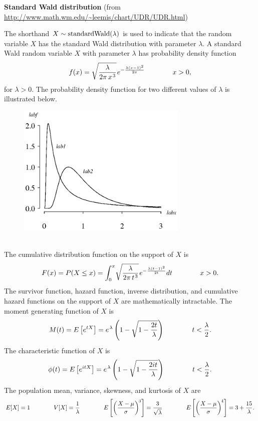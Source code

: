 \documentclass[12pt,fullpage]{article}
\begin{document}
\noindent
{\bf Standard Wald distribution} (from \color{blue}\url{http://www.math.wm.edu/~leemis/chart/UDR/UDR.html}\color{black})

\noindent
The shorthand $X \sim {\rm standard Wald}(\lambda)$ is used to indicate that the
random variable $X$ has the standard Wald distribution with parameter $\lambda$.
A standard Wald random variable $X$ with parameter $\lambda$ has probability density function 
$$
f(x) = \sqrt {{\frac {\lambda}{2 \pi \, {x} ^ {\kern 0.08 em 3}}}}{\kern 0.08 em e ^ {- {\frac {\lambda( x - 1) ^ {2}} {2 x}}}} \qquad \qquad x>0,
$$
for $\lambda > 0$.
The probability density function for two different values of $\lambda$ is illustrated below.
{\begin{figure}[h!]
\begin{center}
\includegraphics[width=3.2in]{StandardwaldPlot.ps}
\end{center}
\end{figure}}\\
The cumulative distribution function on
the support of $X$ is
$$
F(x) = P(X \le x) = \int _{0} ^ {x} \! \sqrt {{\frac {\lambda}{2\pi \, {t} ^ {\kern 0.08 em 3}}}}{\kern 0.08 em e ^ {- {\frac {\lambda(t - 1) ^ {2}} {2 t}}}} {dt} \qquad \qquad x > 0.
$$
The survivor function, hazard function, inverse distribution, and cumulative hazard functions on the support of $X$ are mathematically intractable.
The moment generating function of $X$ is
$$
M(t) = E\left[ e ^ {tX} \right] = e ^ {\kern 0.08 em \lambda}\left(1 - \sqrt{1 - \frac{2 t}{\lambda}}\right) \qquad \qquad t < \frac{\lambda}{2}.
$$
The characteristic function of $X$ is
$$
\phi(t) = E\left[ e ^ {itX} \right] =  e ^ {\kern 0.08 em \lambda}\left(1 - \sqrt{1 - \frac{2 it}{\lambda}}\right) \qquad \qquad t < \frac{\lambda}{2}.
$$
The population mean, variance, skewness, and kurtosis of $X$ are
$$
E[X] = 1 \qquad \qquad 
V[X] = \frac{1}{\lambda} \qquad \qquad
E\left[ \left( \frac{X - \mu}{\sigma} \right) ^ {\kern -0.08 em 3} \right] = \frac{3}{\sqrt {\lambda}} \qquad \qquad 
E\left[ \left( \frac{X - \mu}{\sigma} \right) ^  {\kern -0.08 em 4} \right] = 3 + \frac{15}{\lambda}.
$$
\end{document}
